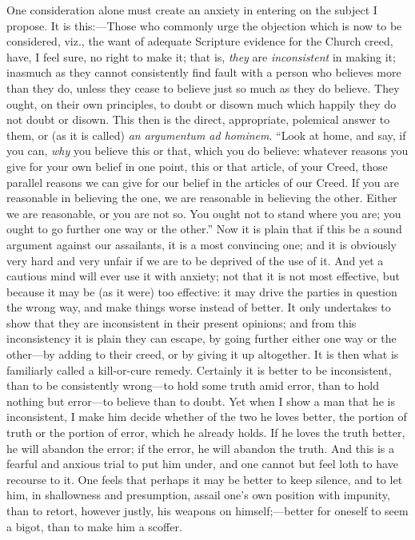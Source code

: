 One consideration alone must create an anxiety in entering on the
subject I propose. It is this:—Those who commonly urge the objection
which is now to be considered, viz., the want of adequate Scripture
evidence for the Church creed, have, I feel sure, no right to make it;
that is, \emph{they} are \emph{inconsistent} in making it; inasmuch as
they cannot consistently find fault with a person who believes more
than they do, unless they cease to believe just so much as they do
believe. They ought, on their own principles, to doubt or disown much
which happily they do not doubt or disown. This then is the direct,
appropriate, polemical answer to them, or (as it is called) \emph{an
argumentum ad hominem}. ``Look at home, and say, if you
can, \emph{why} you believe this or that, which you do believe:
whatever reasons you give for your own belief in one point, this or
that article, of your Creed, those parallel reasons we can give for
our belief in the articles of our Creed. If you are reasonable in
believing the one, we are reasonable in believing the other. Either we
are reasonable, or you are not so. You ought not to stand where you
are; you ought to go further one way or the other.'' Now it is
plain that if this be a sound argument against our assailants, it is a
most convincing one; and it is obviously very hard and very unfair if
we are to be deprived of the use of it. And yet a cautious mind will
ever use it with anxiety; not that it is not most effective, but
because it may be (as it were) too effective: it may drive the parties
in question the wrong way, and make things worse instead of better. It
only undertakes to show that they are inconsistent in their present
opinions; and from this inconsistency it is plain they can escape, by
going further either one way or the other—by adding to their creed,
or by giving it up altogether. It is then what is familiarly called a
kill-or-cure remedy. Certainly it is better to be inconsistent, than
to be consistently wrong—to hold some truth amid error, than to hold
nothing but error—to believe than to doubt. Yet when I show a man
that he is inconsistent, I make him decide whether of the two he loves
better, the portion of truth or the portion of error, which he already
holds. If he loves the truth better, he will abandon the error; if the
error, he will abandon the truth. And this is a fearful and anxious
trial to put him under, and one cannot but feel loth to have recourse
to it. One feels that perhaps it may be better to keep silence, and to
let him, in shallowness and presumption, assail one's own position
with impunity, than to retort, however justly, his weapons on
himself;—better for oneself to seem a bigot, than to make him a
scoffer.

